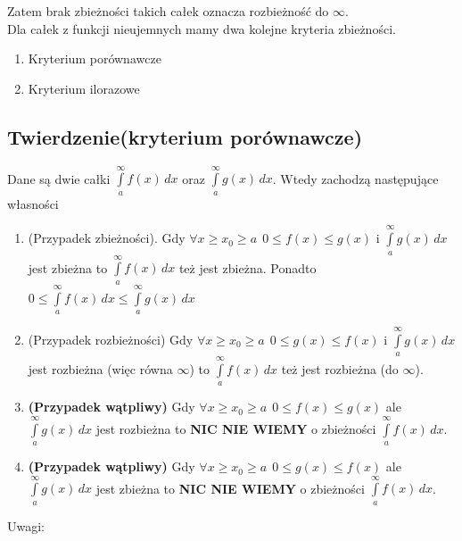 \documentclass[12pt]{article}
\begin{document}
Zatem brak zbieżności takich całek oznacza rozbieżność do $\infty$. \\

Dla całek z funkcji nieujemnych mamy dwa kolejne kryteria zbieżności.

\begin{enumerate}
    \item Kryterium porównawcze
    \item Kryterium ilorazowe
\end{enumerate}

\subsection*{Twierdzenie(kryterium porównawcze)}

Dane są dwie całki $ \int\limits_{a}^{\infty} f(x) \,dx $ oraz
$ \int\limits_{a}^{\infty} g(x) \, dx $. Wtedy zachodzą następujące własności

\begin{enumerate}
    \item (Przypadek zbieżności). Gdy $ \forall x \geq x_0 \geq a \ \ 0 \leq f(x) \leq g(x) $ i $ \int\limits_{a}^{\infty} g(x) \,dx $
    jest zbieżna to $ \int\limits_{a}^{\infty} f(x) \,dx $ też jest zbieżna. Ponadto \
    $ 0 \leq \int\limits_{a}^{\infty} f(x) \,dx \leq \int\limits_{a}^{\infty} g(x) \,dx $
    
    \item (Przypadek rozbieżności) Gdy $ \forall x \geq x_0 \geq a \ \ 0 \leq g(x) \leq f(x) $ i $ \int\limits_{a}^{\infty} g(x) \,dx $
    jest rozbieżna (więc równa $\infty$) to $ \int\limits_{a}^{\infty} f(x) \,dx $ też jest rozbieżna (do $\infty$).
    
    \item \textbf{(Przypadek wątpliwy)} Gdy $ \forall x \geq x_0 \geq a \ \ 0 \leq f(x) \leq g(x) $ ale $ \int\limits_{a}^{\infty} g(x) \,dx $
    jest rozbieżna to \textbf{NIC NIE WIEMY} o zbieżności $ \int\limits_{a}^{\infty} f(x) \,dx $.
    
    \item \textbf{(Przypadek wątpliwy)} Gdy $ \forall x \geq x_0 \geq a \ \ 0 \leq g(x) \leq f(x) $ ale $ \int\limits_{a}^{\infty} g(x) \,dx $
    jest zbieżna to \textbf{NIC NIE WIEMY} o zbieżności $ \int\limits_{a}^{\infty} f(x) \,dx $.
\end{enumerate}

Uwagi:
\end{document}
